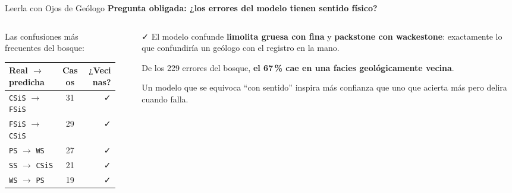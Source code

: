 \documentclass[aspectratio=169, 11pt]{beamer}
\begin{document}
\begin{frame}[shrink=10]{Leerla con Ojos de Geólogo}
  \vspace{-4pt}
  {\small\color{arcaDark}\bfseries
    Pregunta obligada: ¿los errores del modelo tienen sentido físico?}

  \vspace{6pt}
  \begin{columns}[T]
    \begin{column}{0.52\textwidth}
      {\footnotesize\color{textMuted}
      Las confusiones más frecuentes del bosque:}
      \vspace{2pt}
      {\footnotesize
      \begin{tabular}{@{}lcr@{}}
        \toprule
        {\color{arcaDark}\bfseries Real \(\to\) predicha} & {\color{arcaDark}\bfseries Casos}
          & {\color{arcaDark}\bfseries ¿Vecinas?} \\
        \midrule
        \texttt{CSiS} \(\to\) \texttt{FSiS} & 31 & {\color{codeGreen}\faCheck} \\
        \texttt{FSiS} \(\to\) \texttt{CSiS} & 29 & {\color{codeGreen}\faCheck} \\
        \texttt{PS} \(\to\) \texttt{WS} & 27 & {\color{codeGreen}\faCheck} \\
        \texttt{SS} \(\to\) \texttt{CSiS} & 21 & {\color{codeGreen}\faCheck} \\
        \texttt{WS} \(\to\) \texttt{PS} & 19 & {\color{codeGreen}\faCheck} \\
        \bottomrule
      \end{tabular}
      }
    \end{column}
    \begin{column}{0.44\textwidth}
      {\footnotesize\color{textMuted}
      \begin{itemize}\setlength{\itemsep}{5pt}
        \item[{\color{codeGreen}\scriptsize\faCheck}]
          El modelo confunde \textbf{limolita gruesa con fina} y
          \textbf{packstone con wackestone}: exactamente lo que
          confundiría un geólogo con el registro en la mano.
        \item[{\color{arcaRed}\scriptsize\faArrowRight}]
          De los 229 errores del bosque, \textbf{el 67\,\% cae en una
          facies geológicamente vecina}.
        \item[{\color{arcaRed}\scriptsize\faBullseye}]
          Un modelo que se equivoca ``con sentido'' inspira más
          confianza que uno que acierta más pero delira cuando falla.
      \end{itemize}
      }
    \end{column}
  \end{columns}
\end{frame}
\end{document}
